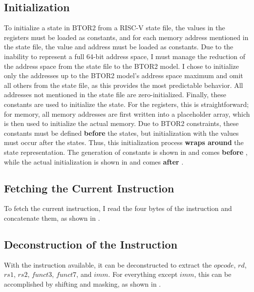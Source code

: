 \subsection{Initialization}\label{sec:initialization}
To initialize a state in BTOR2 from a RISC-V state file, the values
in the registers must be loaded as constants, and for each memory
address mentioned in the state file, the value and address must be
loaded as constants. Due to the inability to represent a full 64-bit
address space, I must manage the reduction of the address space from
the state file to the BTOR2 model. I chose to initialize only the
addresses up to the BTOR2 model's address space maximum and omit all
others from the state file, as this provides the most predictable
behavior. All addresses not mentioned in the state file are
zero-initialized. Finally, these constants are used to initialize the
state. For the registers, this is straightforward; for memory, all
memory addresses are first written into a placeholder array, which is
then used to initialize the actual memory. Due to BTOR2 constraints,
these constants must be defined \textbf{before} the states, but
initialization with the values must occur after the states. Thus,
this initialization process \textbf{wraps around} the state
representation. The generation of constants is shown in
 and comes \textbf{before}
, while the actual initialization is shown in
 and comes \textbf{after} .




\subsection{Fetching the Current Instruction}
To fetch the current instruction, I read the four bytes of the
instruction and concatenate them, as shown in .


\subsection{Deconstruction of the Instruction}
With the instruction available, it can be deconstructed to extract
the $opcode$, $rd$, $rs1$, $rs2$, $funct3$, $funct7$, and $imm$. For
everything except $imm$, this can be accomplished by shifting and
masking, as shown in .

